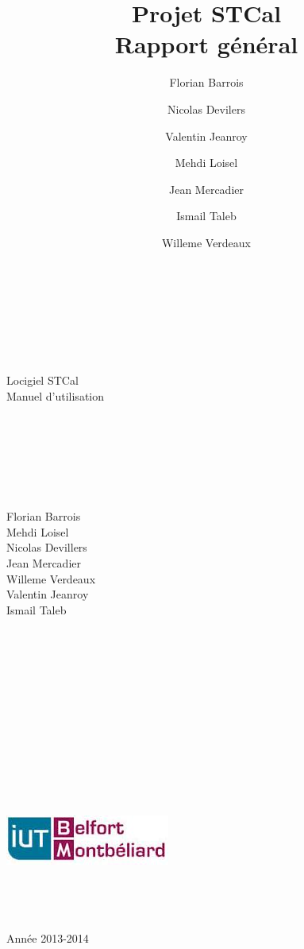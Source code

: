 \documentclass[a4paper,10pt]{report}
\date{}
\title{\Huge{Projet STCal}\\ {\Large Rapport général}}
\author{Florian Barrois \and Nicolas Devilers \and Valentin Jeanroy \and Mehdi Loisel \and Jean Mercadier \and Ismail Taleb \and Willeme Verdeaux}
\begin{document}
 \begin{titlepage}

    \begin{center}
      ~\\~\\~\\~\\~\\
      \Huge
      Locigiel STCal\\
      \LARGE
      Manuel d'utilisation\\
      ~\\~\\~\\~\\~\\~\\
      \begin{multicols}{3}
	\large
	Florian Barrois\\Mehdi Loisel\\
	\columnbreak 
	Nicolas Devillers\\Jean Mercadier\\Willeme Verdeaux\\
	\columnbreak
	Valentin Jeanroy\\Ismail Taleb
      \end{multicols}
    \end{center}


    \begin{center}
    ~\\~\\~\\~\\~\\~\\~\\~\\~\\~\\~\\~\\
    \includegraphics{../general/iutbm.jpeg}
    ~\\~\\~\\~\\~\\
    \large
    Année 2013-2014
    \end{center}

    \end{titlepage}
\end{document}
